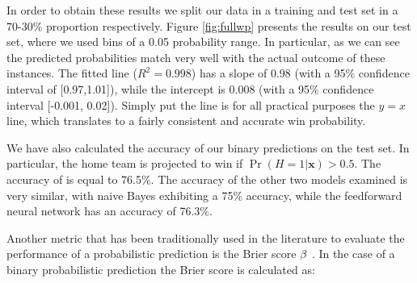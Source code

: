 \documentclass{sig-alternate}
\begin{document}
In order to obtain these results we split our data in a training and test set in a 70-30\% proportion respectively.    
Figure \ref{fig:fullwp} presents the results on our test set, where we used bins of a 0.05 probability range. 
In particular, as we can see the predicted probabilities match very well with the actual outcome of these instances.  
The fitted line ($R^2 = 0.998$) has a slope of 0.98 (with a 95\% confidence interval of [0.97,1.01]), while the intercept is 0.008 (with a 95\% confidence interval [-0.001, 0.02]). %
Simply put the line is for all practical purposes the $y=x$ line, which translates to a fairly consistent and accurate win probability. 

We have also calculated the accuracy of our binary predictions on the test set.  
In particular, the home team is projected to win if $\Pr(H=1| \mathbf{x})>0.5$. 
The accuracy of {\method} is equal to 76.5\%.   
The accuracy of the other two models examined is very similar, with naive Bayes exhibiting a 75\% accuracy, while the feedforward neural network has an accuracy of 76.3\%. 
 
Another metric that has been traditionally used in the literature to evaluate the performance of a probabilistic prediction is the Brier score $\beta$ \cite{brier1950verification}.  
In the case of a binary probabilistic prediction the Brier score is calculated as: 
\end{document}
